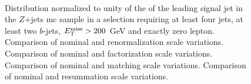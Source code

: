 \begin{figure}[h!]
\centering 
{}
\\
\caption{Distribution normalized to unity of the \pt of the leading signal jet in the $Z$+jets \gls{mc} sample in a selection requiring at least four jets, at least two $b$-jets, $E_{\rm T}^{\mathrm{miss}}>200$ GeV and exactly zero lepton. 
 Comparison of nominal and renormalization scale variations.
 Comparison of nominal and factorization scale variations.
 Comparison of nominal and matching scale variations.
 Comparison of nominal and resummation scale variations.
}\label{fig:Z_met_0L_syst}
\end{figure}

